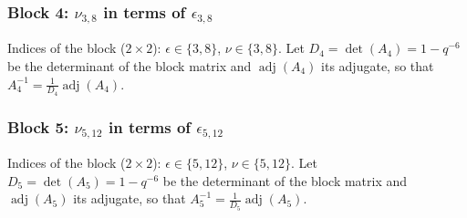 \subsubsection{Block 4: $\nu_{3, 8}$ in terms of $\epsilon_{3, 8}$}
Indices of the block ($2\times 2$): $\epsilon \in \{3, 8\}$, $\nu \in \{3, 8\}$.
Let $D_{4} = \det(A_{4}) = 1-q^{-6}$ be the determinant of the block matrix and $\operatorname{adj}(A_{4})$ its adjugate, so that $A_{4}^{-1} = \frac{1}{D_{4}}\operatorname{adj}(A_{4})$.
\begin{center}
\end{center}

\subsubsection{Block 5: $\nu_{5, 12}$ in terms of $\epsilon_{5, 12}$}
Indices of the block ($2\times 2$): $\epsilon \in \{5, 12\}$, $\nu \in \{5, 12\}$.
Let $D_{5} = \det(A_{5}) = 1-q^{-6}$ be the determinant of the block matrix and $\operatorname{adj}(A_{5})$ its adjugate, so that $A_{5}^{-1} = \frac{1}{D_{5}}\operatorname{adj}(A_{5})$.
\begin{center}
\end{center}

